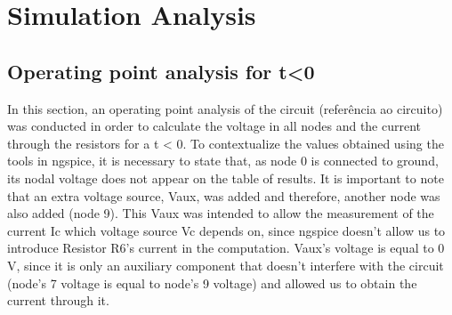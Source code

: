 \section{Simulation Analysis}
\label{sec:simulation}



\subsection{Operating point analysis for t<0}

In this section, an operating point analysis of the circuit (referência ao circuito) was conducted in order to calculate the voltage in all nodes and the current through the resistors for a t < 0. To contextualize the values obtained using the tools in ngspice, it is necessary to state that, as node 0 is connected to ground, its nodal voltage does not appear on the table of results. It is important to note that an extra voltage source, Vaux, was added and therefore, another node was also added (node 9). This Vaux was intended to allow the measurement of the current Ic which voltage source Vc depends on, since ngspice doesn't allow us to introduce Resistor R6's current in the computation. Vaux's voltage is equal to 0 V, since it is only an auxiliary component that doesn't interfere with the circuit (node's 7 voltage is equal to node's 9 voltage) and allowed us to obtain the current through it.

